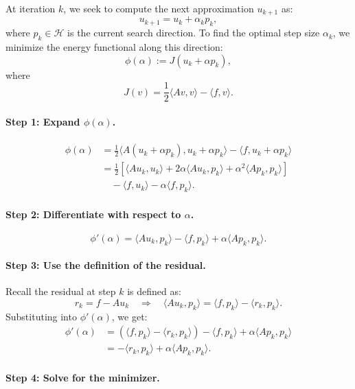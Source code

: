 \documentclass[12pt]{article}
\begin{document}
At iteration \( k \), we seek to compute the next approximation \( u_{k+1} \) as:
\[
u_{k+1} = u_k + \alpha_k p_k,
\]
where \( p_k \in \mathcal{H} \) is the current search direction. To find the optimal step size \( \alpha_k \), we minimize the energy functional along this direction:
\[
\phi(\alpha) := J(u_k + \alpha p_k),
\]
where
\[
J(v) = \frac{1}{2} \langle A v, v \rangle - \langle f, v \rangle.
\]

\paragraph{Step 1: Expand \( \phi(\alpha) \).}

\begin{align*}
\phi(\alpha)
&= \frac{1}{2} \langle A(u_k + \alpha p_k), u_k + \alpha p_k \rangle - \langle f, u_k + \alpha p_k \rangle \\
&= \frac{1}{2} \left[ \langle A u_k, u_k \rangle + 2\alpha \langle A u_k, p_k \rangle + \alpha^2 \langle A p_k, p_k \rangle \right] \\
&\quad - \langle f, u_k \rangle - \alpha \langle f, p_k \rangle.
\end{align*}

\paragraph{Step 2: Differentiate with respect to \( \alpha \).}

\[
\phi'(\alpha) = \langle A u_k, p_k \rangle - \langle f, p_k \rangle + \alpha \langle A p_k, p_k \rangle.
\]

\paragraph{Step 3: Use the definition of the residual.}

Recall the residual at step \( k \) is defined as:
\[
r_k = f - A u_k \quad \Rightarrow \quad \langle A u_k, p_k \rangle = \langle f, p_k \rangle - \langle r_k, p_k \rangle.
\]
Substituting into \( \phi'(\alpha) \), we get:
\begin{align*}
\phi'(\alpha)
&= (\langle f, p_k \rangle - \langle r_k, p_k \rangle) - \langle f, p_k \rangle + \alpha \langle A p_k, p_k \rangle \\
&= - \langle r_k, p_k \rangle + \alpha \langle A p_k, p_k \rangle.
\end{align*}

\paragraph{Step 4: Solve for the minimizer.}
\end{document}
